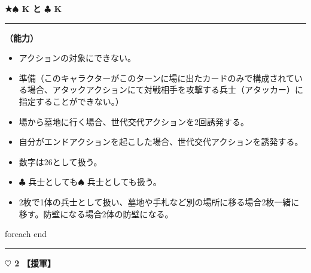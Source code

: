 \documentclass[twocolumn,a5paper,papersize,10pt]{jarticle}
\begin{document}
\vspace{2mm}
\begin{tcolorbox}[title={\small\bf【Character】魔王}{\scriptsize （兵士）}]

  {\scriptsize\bf ★{\normalsize $\spadesuit$} K と {\normalsize $\clubsuit$} K}

\vspace{1mm} %
\hrule height 0.1mm depth 0mm width 62mm %
\vspace{1mm} %

{\bf（能力）}


\vspace{-1zh}%
\begin{itemize}
\setlength{\leftskip}{-0.3cm}
\setlength{\parskip}{0pt} %

\item アクションの対象にできない。

\item 準備（このキャラクターがこのターンに場に出たカードのみで構成されている場合、アタックアクションにて対戦相手を攻撃する兵士（アタッカー）に指定することができない。）

\item 場から墓地に行く場合、世代交代アクションを2回誘発する。

\item 自分がエンドアクションを起こした場合、世代交代アクションを誘発する。

\item 数字は26として扱う。

\item {\normalsize $\clubsuit$} 兵士としても{\normalsize $\spadesuit$} 兵士としても扱う。

\item 2枚で1体の兵士として扱い、墓地や手札など別の場所に移る場合2枚一緒に移す。防壁になる場合2体の防壁になる。
\vspace{-1zh}%
\end{itemize}

\vspace{1mm} %
\end{tcolorbox}

\vspace{-1zh}
 foreach end
 

\vspace{3mm} %
\hrule height 0.5mm depth 0mm width 66.5mm %
\vspace{1mm} %
{\Large\bf $\heartsuit$ 2} {\normalsize\bf【援軍】} %
\vspace{1mm} %
\end{document}

